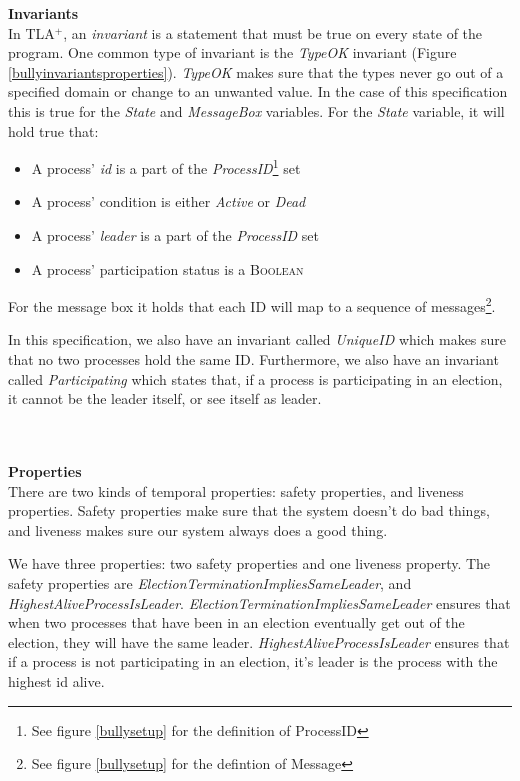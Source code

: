 \documentclass{report}
\begin{document}
\textbf{Invariants}\\
\noindent
In TLA$^{+}$, an \textit{invariant} is a statement that must be true on every state of the program\cite{https://learntla.com/core/invariants.html}. One common type of invariant is the \textit{TypeOK} invariant (Figure \ref{bullyinvariantsproperties}). \textit{TypeOK} makes sure that the types never go out of a specified domain or change to an unwanted value. In the case of this specification this is true for the \textit{State} and \textit{MessageBox} variables. For the \textit{State} variable, it will hold true that:
\begin{itemize}
  \item A process' \textit{id} is a part of the \textit{ProcessID}\footnote{See figure \ref{bullysetup} for the definition of ProcessID} set
  \item A process' condition is either \textit{Active} or \textit{Dead}
  \item A process' \textit{leader} is a part of the \textit{ProcessID} set
  \item A process' participation status is a \textsc{Boolean}
\end{itemize}
For the message box it holds that each ID will map to a sequence of messages\footnote{See figure \ref{bullysetup} for the defintion of Message}.

In this specification, we also have an invariant called \textit{UniqueID} which makes sure that no two processes hold the same ID. Furthermore, we also have an invariant called \textit{Participating} which states that, if a process is participating in an election, it cannot be the leader itself, or see itself as leader.

\\\\
\noindent
\textbf{Properties}\\
\noindent
There are two kinds of temporal properties: safety properties, and liveness properties. Safety properties make sure that the system doesn't do bad things, and liveness makes sure our system always does a good thing.\cite{https://learntla.com/core/temporal-logic.html}

We have three properties: two safety properties and one liveness property. The safety properties are \textit{ElectionTerminationImpliesSameLeader}, and \textit{HighestAliveProcessIsLeader}. \textit{ElectionTerminationImpliesSameLeader} ensures that when two processes that have been in an election eventually get out of the election, they will have the same leader. \textit{HighestAliveProcessIsLeader} ensures that if a process is not participating in an election, it's leader is the process with the highest id alive.
\end{document}
